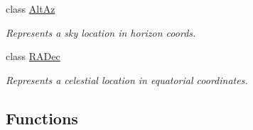 \begin{DoxyCompactItemize}
class \hyperlink{classamonpy_1_1sim_1_1sidereal__m_1_1_alt_az}{Alt\-Az}
\begin{DoxyCompactList}\small\item\em Represents a sky location in horizon coords. \end{DoxyCompactList}\item 
class \hyperlink{classamonpy_1_1sim_1_1sidereal__m_1_1_r_a_dec}{R\-A\-Dec}
\begin{DoxyCompactList}\small\item\em Represents a celestial location in equatorial coordinates. \end{DoxyCompactList}\end{DoxyCompactItemize}
\subsection*{Functions}
